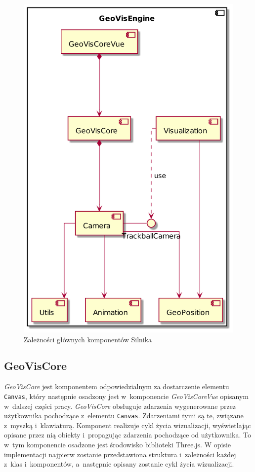 \begin{figure}
    \centering 
    \includegraphics[scale=0.3]{diagrams/out/c3_geo_vis_engine.png}
    \caption{Zależności głównych komponentów Silnika}
    \label{fig:c3_geo_vis_engine}
\end{figure}

\subsection{GeoVisCore}

\textit{GeoVisCore} jest komponentem odpowiedzialnym za dostarczenie elementu \texttt{Canvas}, który następnie osadzony jest w~komponencie \textit{GeoVisCoreVue} opisanym w~dalszej części pracy. \mbox{\textit{GeoVisCore}} obsługuje zdarzenia wygenerowane przez użytkownika pochodzące z~elementu \texttt{Canvas}. Zdarzeniami tymi są te, związane z~myszką i~klawiaturą. Komponent realizuje cykl życia wizualizacji, wyświetlając opisane przez nią obiekty i~propagując zdarzenia pochodzące od użytkownika. To w~tym komponencie osadzone jest środowisko biblioteki Three.js.
W opisie implementacji najpierw zostanie przedstawiona struktura i~zależności każdej z~klas i~komponentów, a~następnie opisany zostanie cykl życia wizualizacji.


